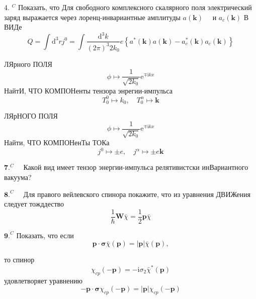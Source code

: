 \documentclass[a4paper,12pt]{article} %
\begin{document}
\begin{task}

4. $^{C}$ Показать, что Для свободного комплексного скалярного поля электрический заряд выражается через лоренц-инвариантные амплитуды $a(\boldsymbol{k}) \quad$ и $a_{c}(\boldsymbol{k})$ В ВИДе
$$
Q=\int \mathrm{d}^{3} r j^{0}=\int \frac{\mathrm{d}^{3} k}{(2 \pi)^{3} 2 k_{0}} e\left\{a^{*}(\boldsymbol{k}) a(\boldsymbol{k})-a_{c}^{*}(\boldsymbol{k}) a_{c}(\boldsymbol{k})\right\}
$$


\end{task}



\begin{task}

ЛЯрного ПОЛЯ
$$
\phi \mapsto \frac{1}{\sqrt{2 k_{0}}} \mathrm{e}^{\mp \mathrm{i} k x}
$$
НайтИ, ЧТО КОМПОНенты тензора энрегии-импульса
$$
T_{0}^{0} \mapsto k_{0}, \quad T_{0}^{\alpha} \mapsto \boldsymbol{k}
$$



\end{task}



\begin{task}

ЛЯрНОГО ПОЛЯ
$$
\phi \mapsto \frac{1}{\sqrt{2 k_{0}}} \mathrm{e}^{\mp \mathrm{i} k x}
$$
Найти, ЧТО КОМПОНенТы ТОКа
$$
j^{0} \mapsto \pm e, \quad j^{\alpha} \mapsto \pm e \boldsymbol{k}
$$


\end{task}



\begin{task}

$\mathbf{7} .^{C} \quad$ Какой вид имеет тензор энергии-импульса релятивистски инВариантного вакуума?


\end{task}



\begin{task}

$\mathbf{8 .}^{C} \quad$ Для правого вейлевского спинора покажите, что из уравнения ДВИЖения следует тожддество
$$
\frac{1}{\hbar} \boldsymbol{W} \bar{\chi}=\frac{1}{2} \boldsymbol{p} \bar{\chi}
$$


\end{task}



\begin{task}

$\mathbf{9 .}^{C}$ Показать, что если
$$
\boldsymbol{p} \cdot \boldsymbol{\sigma} \bar{\chi}(\boldsymbol{p})=|\boldsymbol{p}| \bar{\chi}(\boldsymbol{p}),
$$

то спинор
$$
\chi_{c p}(-\boldsymbol{p})=-\mathrm{i} \sigma_{2} \bar{\chi}^{*}(\boldsymbol{p})
$$
удовлетворяет уравнению
$$
-\boldsymbol{p} \cdot \boldsymbol{\sigma} \chi_{c p}(-\boldsymbol{p})=|\boldsymbol{p}| \chi_{c p}(-\boldsymbol{p})
$$


\end{task}
\end{document}
